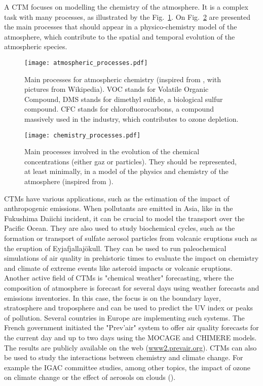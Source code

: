 A CTM focuses on modelling the chemistry of the atmosphere. It is a complex task
with many processes, as illustrated by the Fig.~\ref{fig:atmospheric_proc}. On
Fig.~\ref{fig:chem_processes} are presented the main processes that should
appear in a physico-chemistry model of the atmosphere, which contribute to the
spatial and temporal evolution of the atmospheric species.
\begin{figure}
  \centering
  \texttt{[image: atmospheric\_processes.pdf]}
  \caption{Main processes for atmospheric chemistry (inspired from
    \cite{Delmas2005}, with pictures from Wikipedia). VOC stands for Volatile
    Organic Compound, DMS stands for dimethyl sulfide, a biological sulfur
    compound. CFC stands for chlorofluorocarbons, a compound massively used in the
  industry, which contributes to ozone depletion. } \label{fig:atmospheric_proc}
\end{figure}
\begin{figure}
  \centering
  \texttt{[image: chemistry\_processes.pdf]}
  \caption{Main processes involved in the evolution of the chemical
    concentrations (either gaz or particles). They should be represented, at
    least minimally, in a model of the physics and chemistry of the atmosphere
    (inspired from \cite{Delmas2005}). }
  \label{fig:chem_processes}
\end{figure}
CTMs have various applications, such as the estimation of the impact of
anthropogenic emissions. When pollutants are emitted in Asia, like in the
Fukushima Daiichi incident, it can be crucial to model the transport over the
Pacific Ocean. They are also used to study biochemical cycles, such as the
formation or transport of sulfate aerosol particles from volcanic eruptions such
as the eruption of Eyjafjallaj\"okull. They can be used to run paleochemical
simulations of air quality in prehistoric times to evaluate the impact on
chemistry and climate of extreme events like asteroid impacts or volcanic
eruptions. Another active field of CTMs is "chemical weather" forecasting,
where the composition of atmosphere is forecast for several days using weather
forecasts and emissions inventories. In this case, the focus is on the
boundary layer, \gls{stratosphere} and \gls{troposphere} and can be used to
predict the UV index or peaks of pollution. Several countries in Europe are
implementing such systems.  The French government initiated the "Prev'air"
system to offer air quality forecasts for the current day and up to two days
using the MOCAGE and CHIMERE models.  The results are publicly available on the
web (\url{www2.prevair.org}).  CTMs can also be used to study the interactions
between chemistry and climate change.  For example the IGAC committee studies,
among other topics, the impact of ozone on climate change or the effect of
aerosols on clouds (\cite{IGAC2006}).

